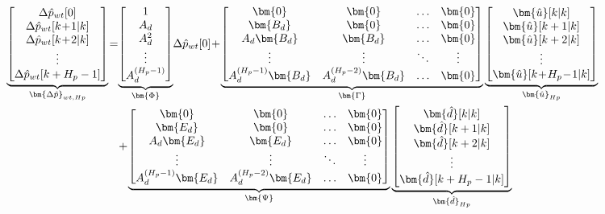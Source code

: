 \begin{align}\hspace{-0.8cm}
\underbrace{\begin{bmatrix}
\Delta \hat p_{wt}[0] \\
\Delta \hat p_{wt}[k\!+\!1|k] \\ 
\Delta \hat p_{wt}[k\!+\!2|k]\\ 
\vdots \\ 
\Delta \hat p_{wt}[k+H_p-1]\\ 
\end{bmatrix}}_{\bm{\Delta \hat{p}}_{wt,Hp}}
\!=\!
&\underbrace{\begin{bmatrix}
1 \\
A_d \\ 
A_d^2\\ 
\vdots \\ 
A_d^{(H_p-1)}\\ 
\end{bmatrix}}_{\bm{\Phi}}
\! \Delta \hat{p}_{wt}[0]\!+\!\nonumber
\underbrace{\begin{bmatrix}
 \bm{0}        & \bm{0}                &\hdots & \bm{0}\\ 
 \bm{B_d}         & \bm{0}                &\hdots & \bm{0}\\ 
 A_d\bm{B_d}      &  \bm{B_d}             &\hdots & \bm{0}\\ 
\vdots            &\vdots                 &\ddots  & \vdots\\ 
 A_d^{(H_p-1)}\bm{B_d}& A_d^{(H_p-2)}\bm{B_d}   &\hdots & \bm{0}\end{bmatrix}}_{\bm{\Gamma}}
\underbrace{\begin{bmatrix}
 \bm{\hat{u}}[k|k] \\ 
 \bm{\hat{u}}[k+1|k]\\ 
  \bm{\hat{u}}[k+2|k]\\ 
\vdots \\ 
 \bm{\hat{u}}[k\!+\!H_p\!-\!1|k]\\ 
\end{bmatrix}}_{\bm{\hat{u}}_{Hp}} \\
\!\!&+\! 
\underbrace{\begin{bmatrix}
\bm{0} & \bm{0} & \hdots  & \bm{0}\\ 
 \bm{E_d}& \bm{0} & \hdots  & \bm{0}\\ 
 A_d\bm{E_d}&  \bm{E_d}& \hdots & \bm{0}\\ 
\vdots &\vdots  & \ddots  & \vdots\\ 
 A_d^{(H_p-1)}\bm{E_d}& A_d^{(H_p-2)}\bm{E_d}  & \hdots  & \bm{0}
\end{bmatrix}}_{\bm{\Psi}}
\underbrace{\begin{bmatrix}
 \bm{\hat{d}}[k|k] \\ 
 \bm{\hat{d}}[k+1|k]\\ 
  \bm{\hat{d}}[k+2|k]\\ 
\vdots \\ 
 \bm{\hat{d}}[k+H_p-1|k]\\ 
\end{bmatrix}}_{\bm{\hat{d}}_{Hp}} 
\end{align}

